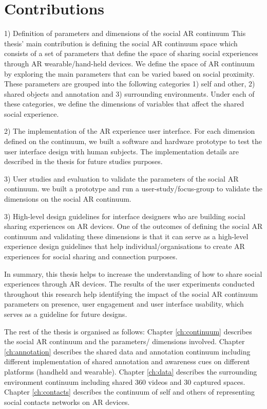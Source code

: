 \section{Contributions}

1) Definition of parameters and dimensions of the social AR continuum 
This thesis' main contribution is defining the social AR continuum space which consists of a set of parameters that define the space of sharing social experiences through AR wearable/hand-held devices. We define the space of AR continuum by exploring the main parameters that can be varied based on social proximity. These parameters are grouped into the following categories 1) self and other, 2) shared objects and annotation and 3) surrounding environments. Under each of these categories, we define the dimensions of variables that affect the shared social experience. 

2) The implementation of the AR experience user interface. For each dimension defined on the continuum, we built a software and hardware prototype to test the user interface design with human subjects. The implementation details are described in the thesis for future studies purposes.

3) User studies and evaluation to validate the parameters of the social AR continuum.  we built a prototype and run a user-study/focus-group to validate the dimensions on the social AR continuum. 

3) High-level design guidelines for interface designers who are building social sharing experiences on AR devices. One of the outcomes of defining the social AR continuum and validating these dimensions is that it can serve as a high-level experience design guidelines that help individual/organisations to create AR experiences for social sharing and connection purposes.

In summary, this thesis helps to increase the understanding of how to share social experiences through AR devices. The results of the user experiments conducted throughout this research help identifying the impact of the social AR continuum parameters on presence, user engagement and user interface usability, which serves as a guideline for future designs. 

The rest of the thesis is organised as follows: Chapter \ref{ch:continuum} describes the social AR continuum and the parameters/ dimensions involved. Chapter \ref{ch:annotation} describes the shared data and annotation continuum including different implementation of shared annotation and awareness cues on different platforms (handheld and wearable). Chapter \ref{ch:data} describes the surrounding environment continuum including shared 360 videos and 30 captured spaces. Chapter \ref{ch:contacts} describes the continuum of self and others of representing social contacts networks on AR devices. 


